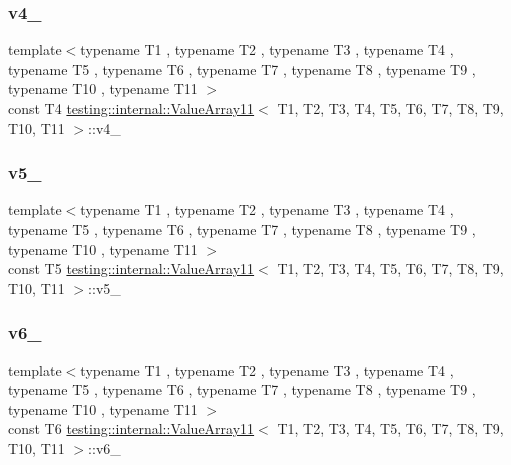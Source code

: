 \subsubsection{\texorpdfstring{v4\_}{v4\_}}
{\footnotesize\ttfamily template$<$typename T1 , typename T2 , typename T3 , typename T4 , typename T5 , typename T6 , typename T7 , typename T8 , typename T9 , typename T10 , typename T11 $>$ \\
const T4 \mbox{\hyperlink{classtesting_1_1internal_1_1_value_array11}{testing\+::internal\+::\+Value\+Array11}}$<$ T1, T2, T3, T4, T5, T6, T7, T8, T9, T10, T11 $>$\+::v4\+\_\+\hspace{0.3cm}{\ttfamily [private]}}

\mbox{\label{classtesting_1_1internal_1_1_value_array11_a4d8f6379f4d25bbb42330efe4fd48860}} 
\subsubsection{\texorpdfstring{v5\_}{v5\_}}
{\footnotesize\ttfamily template$<$typename T1 , typename T2 , typename T3 , typename T4 , typename T5 , typename T6 , typename T7 , typename T8 , typename T9 , typename T10 , typename T11 $>$ \\
const T5 \mbox{\hyperlink{classtesting_1_1internal_1_1_value_array11}{testing\+::internal\+::\+Value\+Array11}}$<$ T1, T2, T3, T4, T5, T6, T7, T8, T9, T10, T11 $>$\+::v5\+\_\+\hspace{0.3cm}{\ttfamily [private]}}

\mbox{\label{classtesting_1_1internal_1_1_value_array11_ac1516573b1782065efb71be155ff6c92}} 
\subsubsection{\texorpdfstring{v6\_}{v6\_}}
{\footnotesize\ttfamily template$<$typename T1 , typename T2 , typename T3 , typename T4 , typename T5 , typename T6 , typename T7 , typename T8 , typename T9 , typename T10 , typename T11 $>$ \\
const T6 \mbox{\hyperlink{classtesting_1_1internal_1_1_value_array11}{testing\+::internal\+::\+Value\+Array11}}$<$ T1, T2, T3, T4, T5, T6, T7, T8, T9, T10, T11 $>$\+::v6\+\_\+\hspace{0.3cm}{\ttfamily [private]}}

